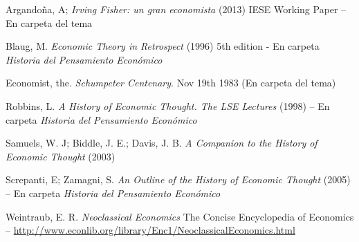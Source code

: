 \documentclass{nuevotema}
\begin{document}
Argandoña, A; \textit{Irving Fisher: un gran economista} (2013) IESE Working Paper -- En carpeta del tema

Blaug, M. \textit{Economic Theory in Retrospect} (1996) 5th edition - En carpeta \textit{Historia del Pensamiento Económico}

Economist, the. \textit{Schumpeter Centenary}. Nov 19th 1983 (En carpeta del tema)

Robbins, L. \textit{A History of Economic Thought. The LSE Lectures} (1998) -- En carpeta \textit{Historia del Pensamiento Económico}

Samuels, W. J; Biddle, J. E.; Davis, J. B. \textit{A Companion to the History of Economic Thought} (2003)

Screpanti, E; Zamagni, S. \textit{An Outline of the History of Economic Thought} (2005) -- En carpeta \textit{Historia del Pensamiento Económico}

Weintraub, E. R. \textit{Neoclassical Economics} The Concise Encyclopedia of Economics -- \url{http://www.econlib.org/library/Enc1/NeoclassicalEconomics.html}
\end{document}

